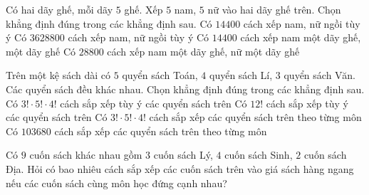 \begin{ex}%
	Có hai dãy ghế, mỗi dãy  $5$ ghế. Xếp $5$ nam, $5$ nữ vào hai dãy ghế trên. Chọn khẳng định đúng trong các khẳng định sau.
	 \choiceTF
		{Có $14400$ cách xếp nam,  nữ ngồi tùy ý}
		{\True Có $3628800$  cách xếp nam, nữ ngồi tùy ý}
		{Có $14400$ cách xếp  nam một dãy ghế, một dãy ghế}
		{\True Có $28800$ cách xếp nam một dãy ghế, nữ  một dãy ghế}
\end{ex}

\begin{ex}%
	Trên một kệ sách dài có $ 5 $ quyển sách  Toán, $ 4 $ quyển sách Lí, $3$ quyển sách Văn. Các quyển sách đều khác nhau. Chọn khẳng định đúng trong các khẳng định sau.
	 \choiceTF
		{Có $3!\cdot 5!\cdot  4!$ cách sắp xếp tùy ý các quyển sách trên}
		{\True Có $12!$ cách sắp  xếp tùy ý các quyển sách trên}
		{Có $3!\cdot 5!\cdot 4!$ cách sắp xếp các quyển sách trên  theo từng môn}
		{\True Có $103680$ cách sắp xếp các quyển  sách trên theo từng môn}
\end{ex}


\begin{bt}%
	Có $9$ cuốn sách khác nhau gồm $3$ cuốn sách Lý, $4$ cuốn sách Sinh, $2$ cuốn sách Địa. Hỏi có bao nhiêu cách sắp xếp  các cuốn sách trên vào giá sách hàng ngang nếu các cuốn sách cùng môn học đứng cạnh nhau?
\end{bt}

